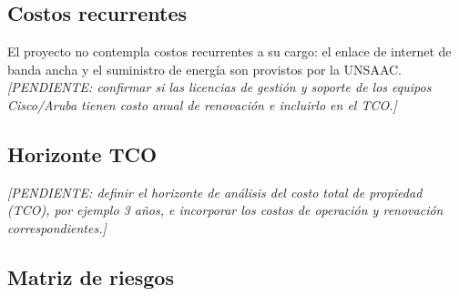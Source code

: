 \subsection{Costos recurrentes}

	El proyecto no contempla costos recurrentes a su cargo: el enlace de internet de banda ancha y el suministro de energía son provistos por la UNSAAC. \textit{[PENDIENTE: confirmar si las licencias de gestión y soporte de los equipos Cisco/Aruba tienen costo anual de renovación e incluirlo en el TCO.]}

\subsection{Horizonte TCO}

	\textit{[PENDIENTE: definir el horizonte de análisis del costo total de propiedad (TCO), por ejemplo 3 años, e incorporar los costos de operación y renovación correspondientes.]}

\subsection{Matriz de riesgos}

	 \label{tab:riesgos}


